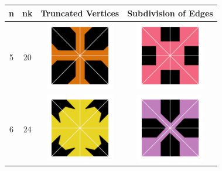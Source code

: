 \documentclass{beamer}
\begin{document}
\begin{frame}
\begin{table}
\centering
\begin{tabular}{c|c|c|c}
n & nk & Truncated Vertices & Subdivision of Edges \\\hline
5 & 20 & \includegraphics[width=3cm]{20tv} &\includegraphics[width=3cm]{20se} \\\hline
6 & 24 & \includegraphics[width=3cm]{24_tv} &\includegraphics[width=3cm]{24se}\\\hline
\end{tabular}
\end{table}
\end{frame}
\end{document}

